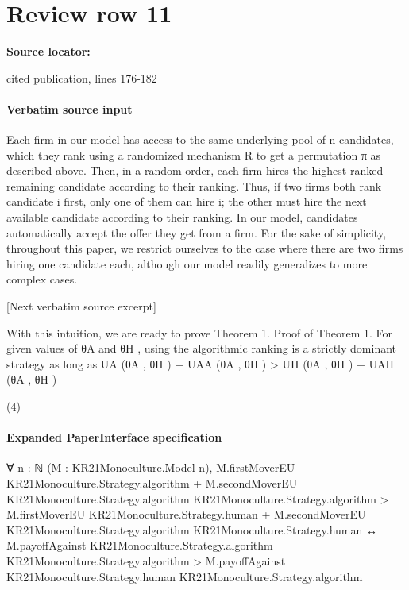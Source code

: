 \documentclass[10pt]{article}
\begin{document}
\section*{Review row 11}
\textbf{Source locator:} {\footnotesize\raggedright cited publication, lines 176-\allowbreak{}182\par}
\paragraph{Verbatim source input}
\begin{ReviewVerbatim}
Each firm in our model has access to the same underlying pool of n candidates, which they rank using
a randomized mechanism R to get a permutation π as described above. Then, in a random order, each
firm hires the highest-ranked remaining candidate according to their ranking. Thus, if two firms both rank
candidate i first, only one of them can hire i; the other must hire the next available candidate according to
their ranking. In our model, candidates automatically accept the offer they get from a firm. For the sake
of simplicity, throughout this paper, we restrict ourselves to the case where there are two firms hiring one
candidate each, although our model readily generalizes to more complex cases.

[Next verbatim source excerpt]

With this intuition, we are ready to prove Theorem 1.
Proof of Theorem 1. For given values of θA and θH , using the algorithmic ranking is a strictly dominant
strategy as long as
UA (θA , θH ) + UAA (θA , θH ) > UH (θA , θH ) + UAH (θA , θH )

(4)
\end{ReviewVerbatim}


\paragraph{Expanded PaperInterface specification}
\begin{ReviewVerbatim}
∀ {n : ℕ} (M : KR21Monoculture.Model n),
  M.firstMoverEU KR21Monoculture.Strategy.algorithm +
        M.secondMoverEU KR21Monoculture.Strategy.algorithm KR21Monoculture.Strategy.algorithm >
      M.firstMoverEU KR21Monoculture.Strategy.human +
        M.secondMoverEU KR21Monoculture.Strategy.algorithm KR21Monoculture.Strategy.human ↔
    M.payoffAgainst KR21Monoculture.Strategy.algorithm KR21Monoculture.Strategy.algorithm >
      M.payoffAgainst KR21Monoculture.Strategy.human KR21Monoculture.Strategy.algorithm
\end{ReviewVerbatim}
\end{document}
